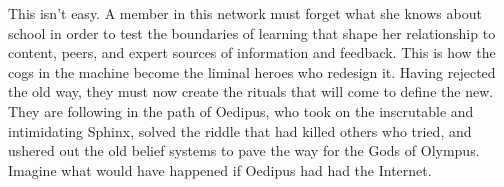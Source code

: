 This isn't easy. A member in this network must forget what she knows
about school in order to test the boundaries of learning that shape her
relationship to content, peers, and expert sources of information and
feedback. This is how the cogs in the machine become the liminal heroes
who redesign it. Having rejected the old way, they must now create the
rituals that will come to define the new. They are following in the path
of Oedipus, who took on the inscrutable and intimidating Sphinx, solved
the riddle that had killed others who tried, and ushered out the old
belief systems to pave the way for the Gods of Olympus.~ Imagine what
would have happened if Oedipus had had the Internet.

\label{sphinx-end}
